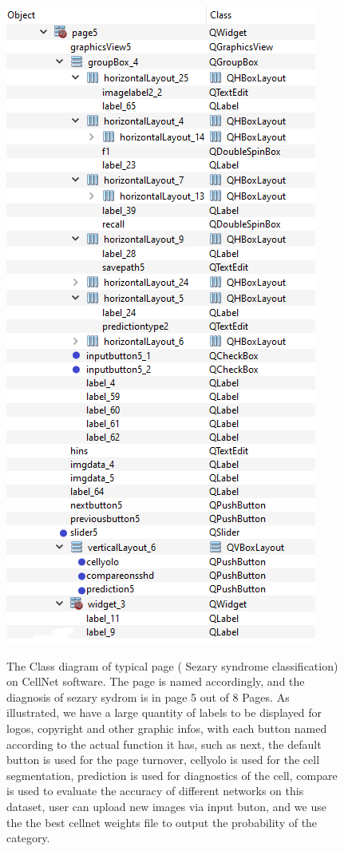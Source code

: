 \begin{figure}[t]
\begin{center}
\includegraphics[height=0.7\textheight]{thesis-template-master/images/tempsnip.png}
\label{fig:cellnet}
\end{center}
\caption{ The Class diagram of typical page ( Sezary syndrome classification) on CellNet software. The page is named accordingly, and the diagnosis of sezary sydrom is in page 5 out of 8 Pages. As illustrated, we have a large quantity of labels to be displayed for logos, copyright and other graphic infos, with each button named according to the actual function it has, such as next, the default button is used for the page turnover, cellyolo is used for the cell segmentation, prediction is used for diagnostics of the cell, compare is used to evaluate the accuracy of different networks on this dataset, user can upload new images via input buton, and we use the the best cellnet weights file to output the probability of the category.}
\end{figure}

